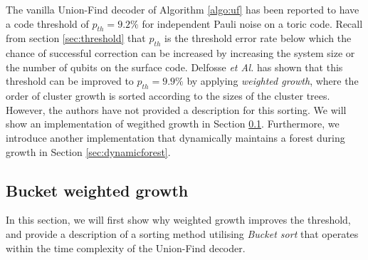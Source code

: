 The vanilla Union-Find decoder of Algorithm \ref{algo:uf} has been reported to have a code threshold of $p_{th}=9.2\%$ for independent Pauli noise \cite{delfosse2017almost} on a toric code. Recall from section \ref{sec:threshold} that $p_{th}$ is the threshold error rate below which the chance of successful correction can be increased by increasing the system size or the number of qubits on the surface code. Delfosse \emph{et Al.} has shown that this threshold can be improved to $p_{th}=9.9\%$ by applying \emph{weighted growth}, where the order of cluster growth is sorted according to the sizes of the cluster trees. However, the authors have not provided a description for this sorting. We will show an implementation of wegithed growth in Section \ref{sec:bucketwg}. Furthermore, we introduce another implementation that dynamically maintains a forest during growth in Section \ref{sec:dynamicforest}.

\subsection{Bucket weighted growth}\label{sec:bucketwg}
In this section, we will first show why weighted growth improves the threshold, and provide a description of a sorting method utilising \emph{Bucket sort} that operates within the time complexity of the Union-Find decoder. 



